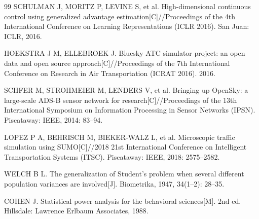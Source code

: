 \documentclass[12pt,a4paper,UTF8]{ctexart}
\begin{document}
\begin{thebibliography}{99}
 SCHULMAN J, MORITZ P, LEVINE S, et al. High-dimensional continuous control using generalized advantage estimation[C]//Proceedings of the 4th International Conference on Learning Representations (ICLR 2016). San Juan: ICLR, 2016.

 HOEKSTRA J M, ELLEBROEK J. Bluesky ATC simulator project: an open data and open source approach[C]//Proceedings of the 7th International Conference on Research in Air Transportation (ICRAT 2016). 2016.

 SCHFER M, STROHMEIER M, LENDERS V, et al. Bringing up OpenSky: a large-scale ADS-B sensor network for research[C]//Proceedings of the 13th International Symposium on Information Processing in Sensor Networks (IPSN). Piscataway: IEEE, 2014: 83--94.

 LOPEZ P A, BEHRISCH M, BIEKER-WALZ L, et al. Microscopic traffic simulation using SUMO[C]//2018 21st International Conference on Intelligent Transportation Systems (ITSC). Piscataway: IEEE, 2018: 2575--2582.

 WELCH B L. The generalization of Student's problem when several different population variances are involved[J]. Biometrika, 1947, 34(1--2): 28--35.

 COHEN J. Statistical power analysis for the behavioral sciences[M]. 2nd ed. Hillsdale: Lawrence Erlbaum Associates, 1988.
\end{thebibliography}
\end{document}
